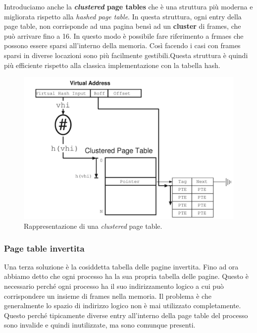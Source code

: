 Introduciamo anche la \textbf{\textit{clustered} page tables} che è una struttura più moderna e migliorata rispetto alla \textit{hashed page table}. In questa struttura, ogni entry della page table, non corrisponde ad una pagina bensì ad un \textbf{cluster} di frames, che può arrivare fino a 16. In questo modo è possibile fare riferimento a frmaes che possono essere sparsi all'interno della memoria. Così facendo i casi con frames sparsi in diverse locazioni sono più facilmente gestibili.Questa struttura è quindi più efficiente rispetto alla classica implementazione con la tabella hash.
\begin{figure}[h]
    \centering
    \includegraphics[width = .5\textwidth]{../res/imgs/main memory/clustered_page_table.png}
    \caption{Rappresentazione di una \textit{clustered} page table.}
    \label{fig:clustered_page_table}
\end{figure}

% 
\subsubsection{Page table invertita}
Una terza soluzione è la cosiddetta tabella delle pagine invertita. Fino ad ora abbiamo detto che ogni processo ha la sua propria tabella delle pagine. Questo è necessario perché ogni processo ha il suo indirizzamento logico a cui può corrispondere un insieme di frames nella memoria. Il problema è che generalmente lo spazio di indirizzo logico non è mai utilizzato completamente. Questo perché tipicamente diverse entry all'interno della page table del processo sono invalide e quindi inutilizzate, ma sono comunque presenti.

